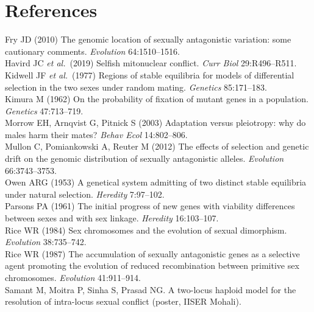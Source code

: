 \documentclass[11pt,a4paper]{article}
\begin{document}
\section*{References}
\small
Fry JD (2010) The genomic location of sexually antagonistic variation: some cautionary comments. \emph{Evolution} 64:1510--1516.\\
Havird JC \emph{et al.}\ (2019) Selfish mitonuclear conflict. \emph{Curr Biol} 29:R496--R511.\\
Kidwell JF \emph{et al.}\ (1977) Regions of stable equilibria for models of differential selection in the two sexes under random mating. \emph{Genetics} 85:171--183.\\
Kimura M (1962) On the probability of fixation of mutant genes in a population. \emph{Genetics} 47:713--719.\\
Morrow EH, Arnqvist G, Pitnick S (2003) Adaptation versus pleiotropy: why do males harm their mates? \emph{Behav Ecol} 14:802--806.\\
Mullon C, Pomiankowski A, Reuter M (2012) The effects of selection and genetic drift on the genomic distribution of sexually antagonistic alleles. \emph{Evolution} 66:3743--3753.\\
Owen ARG (1953) A genetical system admitting of two distinct stable equilibria under natural selection. \emph{Heredity} 7:97--102.\\
Parsons PA (1961) The initial progress of new genes with viability differences between sexes and with sex linkage. \emph{Heredity} 16:103--107.\\
Rice WR (1984) Sex chromosomes and the evolution of sexual dimorphism. \emph{Evolution} 38:735--742.\\
Rice WR (1987) The accumulation of sexually antagonistic genes as a selective agent promoting the evolution of reduced recombination between primitive sex chromosomes. \emph{Evolution} 41:911--914.\\
Samant M, Moitra P, Sinha S, Prasad NG. A two-locus haploid model for the resolution of intra-locus sexual conflict (poster, IISER Mohali).
\end{document}
